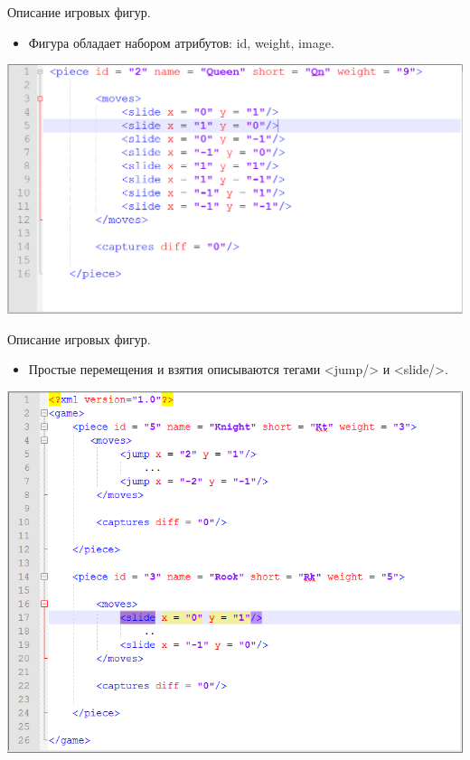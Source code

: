 \documentclass[11pt,slides,aspectratio=43]{beamer}
\begin{document}
    \begin{frame}{Описание игровых фигур.}
		\begin{block}{}
            \begin{itemize}
	           \item Фигура обладает набором атрибутов: id, weight, image.
            \end{itemize}
            \begin{center}
			     \includegraphics[scale=0.33]{attributes.png}
		    \end{center}
		\end{block}
	\end{frame}

    \begin{frame}{Описание игровых фигур.}
		\begin{block}{}
            \begin{itemize}
	           \item Простые перемещения и взятия описываются тегами <jump/> и <slide/>.
            \end{itemize}
            \begin{center}
			     \includegraphics[scale=0.33]{pieces.png}
		    \end{center}
		\end{block}
	\end{frame}
\end{document}
